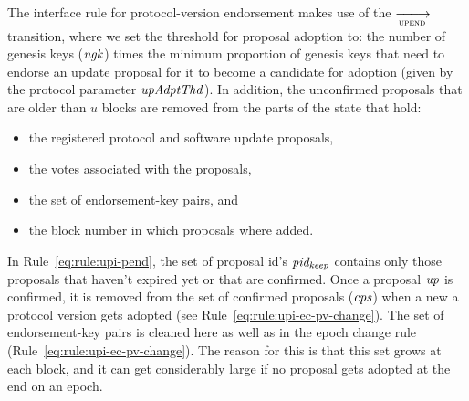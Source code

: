 \clearpage

The interface rule for protocol-version endorsement makes use of the
$\trans{upend}{}$ transition, where we set the threshold for proposal adoption
to: the number of genesis keys ($\mathit{ngk}$) times the minimum proportion of
genesis keys that need to endorse an update proposal for it to become a
candidate for adoption (given by the protocol parameter $\mathit{upAdptThd}$). In
addition, the unconfirmed proposals that are older than $u$ blocks are removed
from the parts of the state that hold:
\begin{itemize}
\item the registered protocol and software update proposals,
\item the votes associated with the proposals,
\item the set of endorsement-key pairs, and
\item the block number in which proposals where added.
\end{itemize}

In Rule~\ref{eq:rule:upi-pend}, the set of proposal id's $\mathit{pid_{keep}}$
contains only those proposals that haven't expired yet or that are confirmed.
Once a proposal $\mathit{up}$ is confirmed, it is removed from the set of
confirmed proposals ($\mathit{cps}$) when a new a protocol version gets adopted
(see Rule~\ref{eq:rule:upi-ec-pv-change}).
%
The set of endorsement-key pairs is cleaned here as well as in the epoch change
rule (Rule~\ref{eq:rule:upi-ec-pv-change}). The reason for this is that this set grows at
each block, and it can get considerably large if no proposal gets adopted at
the end on an epoch.

